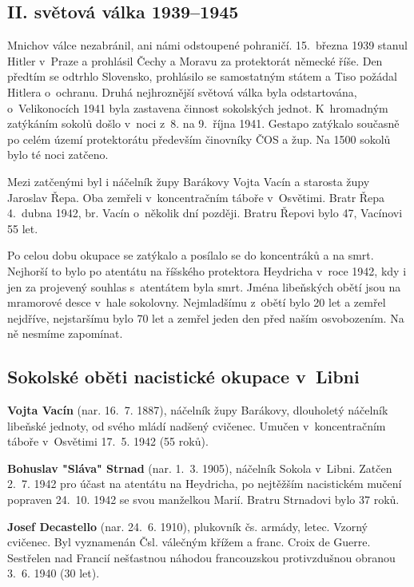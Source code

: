 \documentclass[a5paper, 11pt, twoside]{article}
\begin{document}
\subsection{II. světová válka 1939--1945}

Mnichov válce nezabránil, ani námi odstoupené pohraničí. 15.~března 1939
stanul Hitler v~Praze a prohlásil Čechy a Moravu za protektorát německé
říše. Den předtím se odtrhlo Slovensko, prohlásilo se samostatným státem
a Tiso požádal Hitlera o~ochranu. Druhá nejhroznější světová válka byla
odstartována, o~Velikonocích 1941 byla zastavena činnost sokolských
jednot. K~hromadným zatýkáním sokolů došlo v~noci z~8. na 9.~října 1941.
Gestapo zatýkalo současně po celém území protektorátu především
činovníky ČOS a žup. Na 1500 sokolů bylo té noci zatčeno.

Mezi zatčenými byl i náčelník župy Barákovy Vojta Vacín a starosta župy
Jaroslav Řepa. Oba zemřeli v~koncentračním táboře v~Osvětimi. Bratr Řepa
4.~dubna 1942, br. Vacín o~několik dní později. Bratru Řepovi bylo 47,
Vacínovi 55 let.

Po celou dobu okupace se zatýkalo a posílalo se do koncentráků a na
smrt. Nejhorší to bylo po atentátu na říšského protektora Heydricha
v~roce 1942, kdy i jen za projevený souhlas s~atentátem byla smrt. Jména
libeňských obětí jsou na mramorové desce v~hale sokolovny. Nejmladšímu
z~obětí bylo 20 let a zemřel nejdříve, nejstaršímu bylo 70 let a zemřel
jeden den před naším osvobozením. Na ně nesmíme zapomínat.

\subsection{Sokolské oběti nacistické okupace v~Libni}

\hspace*{\parindent}\textbf{Vojta Vacín} (nar. 16.~7. 1887), náčelník župy Barákovy,
dlouholetý náčelník libeňské jednoty, od svého mládí nadšený cvičenec.
Umučen v~koncentračním táboře v~Osvětimi 17.~5. 1942 (55 roků).

\textbf{Bohuslav "Sláva" Strnad} (nar. 1.~3. 1905), náčelník Sokola
v~Libni. Zatčen 2.~7. 1942 pro účast na atentátu na Heydricha, po
nejtěžším nacistickém mučení popraven 24.~10. 1942 se svou manželkou
Marií. Bratru Strnadovi bylo 37 roků.

\textbf{Josef Decastello} (nar. 24.~6. 1910), plukovník čs. armády,
letec. Vzorný cvičenec. Byl vyznamenán Čsl. válečným křížem a franc.
Croix de Guerre. Sestřelen nad Francií nešťastnou náhodou
francouzskou protivzdušnou obranou 3.~6. 1940 (30 let).
\end{document}
